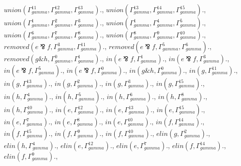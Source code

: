 \documentclass[a4paper, 11pt]{article}
\begin{document}
$union(\Gamma_{gamma}^{11}, \Gamma_{gamma}^{12}, \Gamma_{gamma}^{13}).$, $union(\Gamma_{gamma}^{13}, \Gamma_{gamma}^{14}, \Gamma_{gamma}^{15}).$, $union(\Gamma_{gamma}^{1}, \Gamma_{gamma}^{2}, \Gamma_{gamma}^{3}).$, $union(\Gamma_{gamma}^{1}, \Gamma_{gamma}^{4}, \Gamma_{gamma}^{5}).$, $union(\Gamma_{gamma}^{6}, \Gamma_{gamma}^{7}, \Gamma_{gamma}^{8}).$, $union(\Gamma_{gamma}^{8}, \Gamma_{gamma}^{9}, \Gamma_{gamma}^{10}).$, $removed(e \bindnasrepma f, \Gamma_{gamma}^{3}, \Gamma_{gamma}^{11}).$, $removed(e \bindnasrepma f, \Gamma_{gamma}^{5}, \Gamma_{gamma}^{6}).$, $removed(g \binampersand h, \Gamma_{gamma}^{0}, \Gamma_{gamma}^{1}).$, $in(e \bindnasrepma f, \Gamma_{gamma}^{1}).$, $in(e \bindnasrepma f, \Gamma_{gamma}^{3}).$, $in(e \bindnasrepma f, \Gamma_{gamma}^{5}).$, $in(e \bindnasrepma f, \Gamma_{gamma}^{0}).$, $in(g \binampersand h, \Gamma_{gamma}^{0}).$, $in(g, \Gamma_{gamma}^{11}).$, $in(g, \Gamma_{gamma}^{13}).$, $in(g, \Gamma_{gamma}^{2}).$, $in(g, \Gamma_{gamma}^{3}).$, $in(g, \Gamma_{gamma}^{15}).$, $in(h, \Gamma_{gamma}^{4}).$, $in(h, \Gamma_{gamma}^{5}).$, $in(h, \Gamma_{gamma}^{6}).$, $in(h, \Gamma_{gamma}^{8}).$, $in(h, \Gamma_{gamma}^{10}).$, $in(e, \Gamma_{gamma}^{12}).$, $in(e, \Gamma_{gamma}^{13}).$, $in(e, \Gamma_{gamma}^{15}).$, $in(e, \Gamma_{gamma}^{7}).$, $in(e, \Gamma_{gamma}^{8}).$, $in(e, \Gamma_{gamma}^{10}).$, $in(f, \Gamma_{gamma}^{14}).$, $in(f, \Gamma_{gamma}^{15}).$, $in(f, \Gamma_{gamma}^{9}).$, $in(f, \Gamma_{gamma}^{10}).$, $elin(g, \Gamma_{gamma}^{2}).$, $elin(h, \Gamma_{gamma}^{4}).$, $elin(e, \Gamma_{gamma}^{12}).$, $elin(e, \Gamma_{gamma}^{7}).$, $elin(f, \Gamma_{gamma}^{14}).$, $elin(f, \Gamma_{gamma}^{9}).$, 
\end{document}
